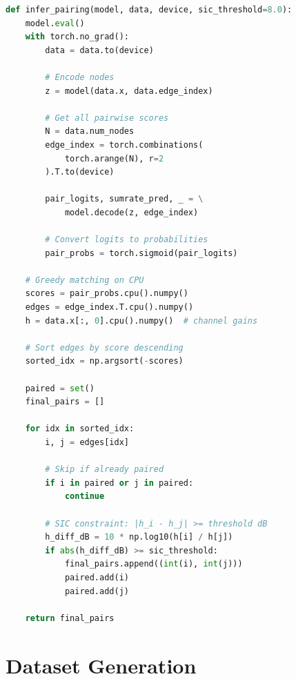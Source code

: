 \begin{lstlisting}[language=Python, caption={Greedy Pairing with SIC Verification}]
def infer_pairing(model, data, device, sic_threshold=8.0):
    model.eval()
    with torch.no_grad():
        data = data.to(device)
        
        # Encode nodes
        z = model(data.x, data.edge_index)
        
        # Get all pairwise scores
        N = data.num_nodes
        edge_index = torch.combinations(
            torch.arange(N), r=2
        ).T.to(device)
        
        pair_logits, sumrate_pred, _ = \
            model.decode(z, edge_index)
        
        # Convert logits to probabilities
        pair_probs = torch.sigmoid(pair_logits)
    
    # Greedy matching on CPU
    scores = pair_probs.cpu().numpy()
    edges = edge_index.T.cpu().numpy()
    h = data.x[:, 0].cpu().numpy()  # channel gains
    
    # Sort edges by score descending
    sorted_idx = np.argsort(-scores)
    
    paired = set()
    final_pairs = []
    
    for idx in sorted_idx:
        i, j = edges[idx]
        
        # Skip if already paired
        if i in paired or j in paired:
            continue
        
        # SIC constraint: |h_i - h_j| >= threshold dB
        h_diff_dB = 10 * np.log10(h[i] / h[j])
        if abs(h_diff_dB) >= sic_threshold:
            final_pairs.append((int(i), int(j)))
            paired.add(i)
            paired.add(j)
    
    return final_pairs
\end{lstlisting}

\section{Dataset Generation}

